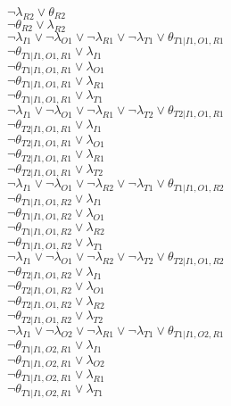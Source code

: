 $\neg\lambda_{R2} \vee \theta_{R2}$\\
$\neg\theta_{R2} \vee \lambda_{R2}$\\
$\neg\lambda_{I1} \vee \neg\lambda_{O1} \vee \neg\lambda_{R1} \vee \neg\lambda_{T1} \vee \theta_{T1|I1,O1,R1}$\\
$\neg\theta_{T1|I1,O1,R1} \vee \lambda_{I1}$\\
$\neg\theta_{T1|I1,O1,R1} \vee \lambda_{O1}$\\
$\neg\theta_{T1|I1,O1,R1} \vee \lambda_{R1}$\\
$\neg\theta_{T1|I1,O1,R1} \vee \lambda_{T1}$\\
$\neg\lambda_{I1} \vee \neg\lambda_{O1} \vee \neg\lambda_{R1} \vee \neg\lambda_{T2} \vee \theta_{T2|I1,O1,R1}$\\
$\neg\theta_{T2|I1,O1,R1} \vee \lambda_{I1}$\\
$\neg\theta_{T2|I1,O1,R1} \vee \lambda_{O1}$\\
$\neg\theta_{T2|I1,O1,R1} \vee \lambda_{R1}$\\
$\neg\theta_{T2|I1,O1,R1} \vee \lambda_{T2}$\\
$\neg\lambda_{I1} \vee \neg\lambda_{O1} \vee \neg\lambda_{R2} \vee \neg\lambda_{T1} \vee \theta_{T1|I1,O1,R2}$\\
$\neg\theta_{T1|I1,O1,R2} \vee \lambda_{I1}$\\
$\neg\theta_{T1|I1,O1,R2} \vee \lambda_{O1}$\\
$\neg\theta_{T1|I1,O1,R2} \vee \lambda_{R2}$\\
$\neg\theta_{T1|I1,O1,R2} \vee \lambda_{T1}$\\
$\neg\lambda_{I1} \vee \neg\lambda_{O1} \vee \neg\lambda_{R2} \vee \neg\lambda_{T2} \vee \theta_{T2|I1,O1,R2}$\\
$\neg\theta_{T2|I1,O1,R2} \vee \lambda_{I1}$\\
$\neg\theta_{T2|I1,O1,R2} \vee \lambda_{O1}$\\
$\neg\theta_{T2|I1,O1,R2} \vee \lambda_{R2}$\\
$\neg\theta_{T2|I1,O1,R2} \vee \lambda_{T2}$\\
$\neg\lambda_{I1} \vee \neg\lambda_{O2} \vee \neg\lambda_{R1} \vee \neg\lambda_{T1} \vee \theta_{T1|I1,O2,R1}$\\
$\neg\theta_{T1|I1,O2,R1} \vee \lambda_{I1}$\\
$\neg\theta_{T1|I1,O2,R1} \vee \lambda_{O2}$\\
$\neg\theta_{T1|I1,O2,R1} \vee \lambda_{R1}$\\
$\neg\theta_{T1|I1,O2,R1} \vee \lambda_{T1}$\\
